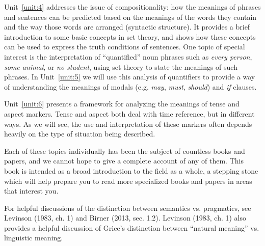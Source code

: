 Unit~\ref{unit:4} addresses the issue of compositionality: how the meanings of phrases and sentences can be predicted based on the meanings of the words they contain and the way those words are arranged (syntactic structure). It provides a brief introduction to some basic concepts in set theory, and shows how these concepts can be used to express the truth conditions of sentences. One topic of special interest is the interpretation of “quantified” noun phrases such as \textit{every person}, \textit{some animal}, or \textit{no student}, using set theory to state the meanings of such phrases. In Unit~\ref{unit:5} we will use this analysis of quantifiers to provide a way of understanding the meanings of modals (e.g. \textit{may}, \textit{must}, \textit{should}) and \textit{if} clauses.



Unit~\ref{unit:6} presents a framework for analyzing the meanings of tense and aspect markers. Tense and aspect both deal with time reference, but in different ways. As we will see, the use and interpretation of these markers often depends heavily on the type of situation being described.



Each of these topics individually has been the subject of countless books and papers, and we cannot hope to give a complete account of any of them. This book is intended as a broad introduction to the field as a whole, a stepping stone which will help prepare you to read more specialized books and papers in areas that interest you.



\furtherreading



For helpful discussions of the distinction between semantics vs. pragmatics, see Levinson (1983, ch. 1) and Birner (2013, sec. 1.2). Levinson (1983, ch. 1) also provides a helpful discussion of Grice’s distinction between “natural meaning” vs. linguistic meaning.